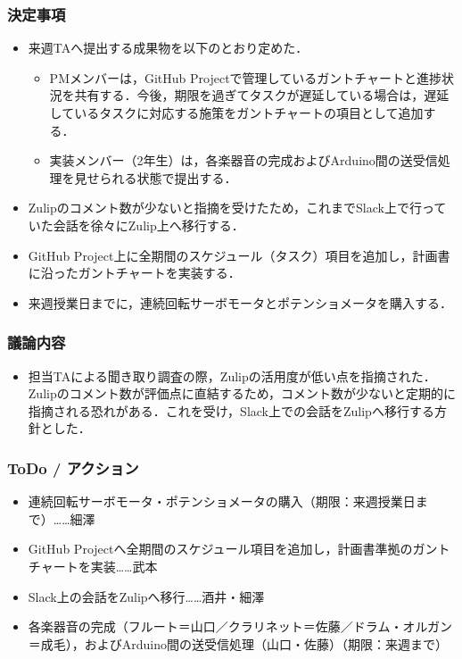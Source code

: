 \documentclass[a4paper,12pt]{ltjsarticle}
\begin{document}
\subsubsection*{決定事項}
\begin{itemize}[leftmargin=1.5em]
  \item 来週TAへ提出する成果物を以下のとおり定めた．
  \begin{itemize}
    \item PMメンバーは，GitHub Projectで管理しているガントチャートと進捗状況を共有する．今後，期限を過ぎてタスクが遅延している場合は，遅延しているタスクに対応する施策をガントチャートの項目として追加する．
    \item 実装メンバー（2年生）は，各楽器音の完成およびArduino間の送受信処理を見せられる状態で提出する．
  \end{itemize}
  \item Zulipのコメント数が少ないと指摘を受けたため，これまでSlack上で行っていた会話を徐々にZulip上へ移行する．
  \item GitHub Project上に全期間のスケジュール（タスク）項目を追加し，計画書に沿ったガントチャートを実装する．
  \item 来週授業日までに，連続回転サーボモータとポテンショメータを購入する．
\end{itemize}

\subsubsection*{議論内容}
\begin{itemize}[leftmargin=1.5em]
  \item 担当TAによる聞き取り調査の際，Zulipの活用度が低い点を指摘された．Zulipのコメント数が評価点に直結するため，コメント数が少ないと定期的に指摘される恐れがある．これを受け，Slack上での会話をZulipへ移行する方針とした．
\end{itemize}

\subsubsection*{ToDo / アクション}
\begin{itemize}[leftmargin=1.5em]
  \item 連続回転サーボモータ・ポテンショメータの購入（期限：来週授業日まで）……細澤
  \item GitHub Projectへ全期間のスケジュール項目を追加し，計画書準拠のガントチャートを実装……武本
  \item Slack上の会話をZulipへ移行……酒井・細澤
  \item 各楽器音の完成（フルート＝山口／クラリネット＝佐藤／ドラム・オルガン＝成毛），およびArduino間の送受信処理（山口・佐藤）（期限：来週まで）
\end{itemize}
\end{document}
